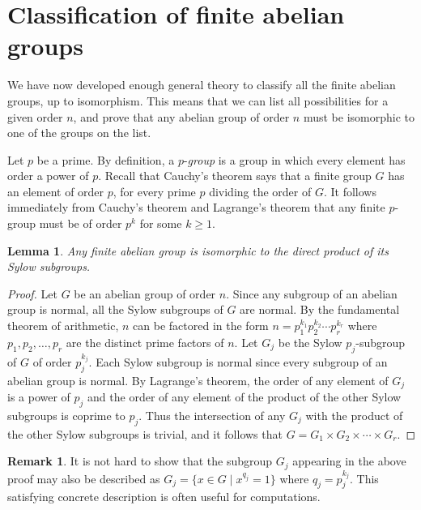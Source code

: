 \documentclass[11pt,oneside]{article}
\newtheorem{lem}[thm]{Lemma}
\theoremstyle{definition}
\newtheorem{rmk}[thm]{Remark}
\begin{document}
\setcounter{section}{29}

\section{Classification of finite abelian groups}\noindent
We have now developed enough general theory to classify all the finite
abelian groups, up to isomorphism. This means that we can list all
possibilities for a given order $n$, and prove that any abelian group
of order $n$ must be isomorphic to one of the groups on the list.

Let $p$ be a prime.  By definition, a $p$-\emph{group} is a group in
which every element has order a power of $p$.  Recall that Cauchy's
theorem says that a finite group $G$ has an element of order $p$, for
every prime $p$ dividing the order of $G$.  It follows immediately
from Cauchy's theorem and Lagrange's theorem that any finite $p$-group
must be of order $p^k$ for some $k \ge 1$.



\begin{lem}\label{lem:Sylows}
  Any finite abelian group is isomorphic to the direct product of its
  Sylow subgroups.
\end{lem}

\begin{proof}
Let $G$ be an abelian group of order $n$.  Since any subgroup of an
abelian group is normal, all the Sylow subgroups of $G$ are normal.
By the fundamental theorem of arithmetic, $n$ can be factored in the
form $n = p_1^{k_1} p_2^{k_2} \cdots p_r^{k_r}$ where $p_1, p_2,
\dots, p_r$ are the distinct prime factors of $n$. Let $G_j$ be the
Sylow $p_j$-subgroup of $G$ of order $p_j^{k_j}$. Each Sylow subgroup
is normal since every subgroup of an abelian group is normal. By
Lagrange's theorem, the order of any element of $G_j$ is a power of
$p_j$ and the order of any element of the product of the other Sylow
subgroups is coprime to $p_j$. Thus the intersection of any $G_j$ with
the product of the other Sylow subgroups is trivial, and it follows
that $G = G_1 \times G_2 \times \cdots \times G_r$.
\end{proof}

\begin{rmk}
It is not hard to show that the subgroup $G_j$ appearing in the above
proof may also be described as $G_j = \{ x \in G \mid x^{q_j} = 1 \}$
where $q_j = p_j^{k_j}$. This satisfying concrete description is often
useful for computations.
\end{rmk}
\end{document}

